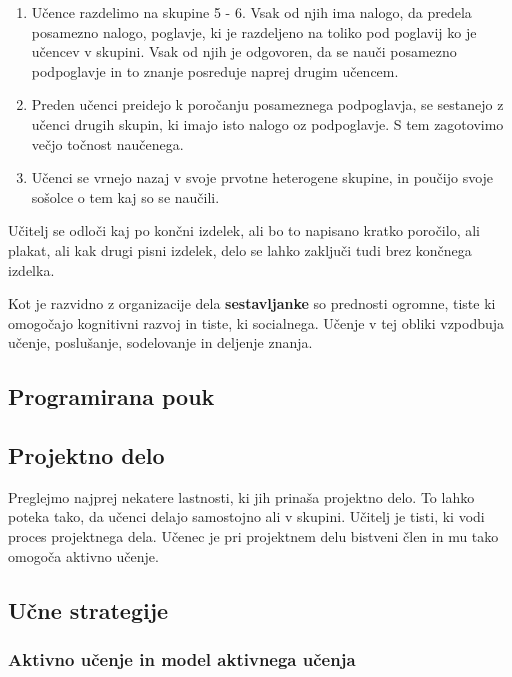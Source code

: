 \begin{description}
  \begin{enumerate}
  \item Učence razdelimo na skupine 5 - 6. Vsak od njih ima nalogo, da
    predela posamezno nalogo, poglavje, ki je razdeljeno na toliko pod
    poglavij ko je učencev v skupini. Vsak od njih je odgovoren, da se
    nauči posamezno podpoglavje in to znanje posreduje naprej drugim
    učencem.
  \item Preden učenci preidejo k poročanju posameznega podpoglavja, se
    sestanejo z učenci drugih skupin, ki imajo isto nalogo oz
    podpoglavje. S tem zagotovimo večjo točnost naučenega.
  \item Učenci se vrnejo nazaj v svoje prvotne heterogene skupine, in
    poučijo svoje sošolce o tem kaj so se naučili.
  \end{enumerate}
  Učitelj se odloči kaj po končni izdelek, ali bo to napisano kratko
  poročilo, ali plakat, ali kak drugi pisni izdelek, delo se lahko
  zaključi tudi brez končnega izdelka.

  Kot je razvidno z organizacije dela \textbf{sestavljanke} so
  prednosti ogromne, tiste ki omogočajo kognitivni razvoj in tiste, ki
  socialnega. Učenje v tej obliki vzpodbuja učenje, poslušanje,
  sodelovanje in deljenje znanja.
\end{description}

\subsection{Programirana pouk}
\label{programirani_pouk
}



\subsection{Projektno delo}
\label{sec:projektno_delo}

Preglejmo najprej nekatere lastnosti, ki jih prinaša projektno
delo. To lahko poteka tako, da učenci delajo samostojno ali v
skupini. Učitelj je tisti, ki vodi proces projektnega dela. Učenec je
pri projektnem delu bistveni člen in mu tako omogoča aktivno učenje.

\subsection{Učne strategije}
\label{sec:učne_strategije}

\subsubsection{Aktivno učenje in model aktivnega učenja}
\label{sec:aktivno_učenje_in_model_aktivnega_učenja}

